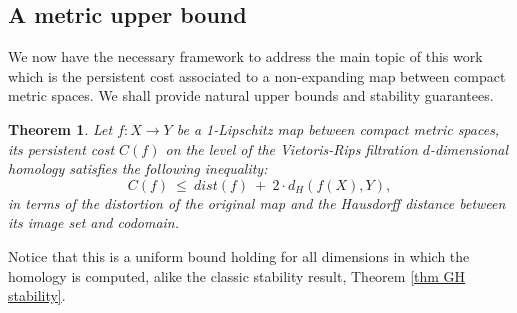 \documentclass[11pt]{article}
\newtheorem{thm}{Theorem}[section]
\begin{document}
\subsection{A metric upper bound} %

We now have the necessary framework to address the main topic of this work which is the persistent cost associated to a non-expanding map between compact metric spaces. 
We shall provide natural upper bounds and stability guarantees. 


\begin{thm}\label{thm main 1 - metric bound} Let $f:X\to Y$ be a 1-Lipschitz map between compact metric spaces, its persistent cost $C(f)$ on the level of the Vietoris-Rips filtration $d$-dimensional homology satisfies the following inequality:
\[ C(f)~\leq~ dist(f)~+~2\cdot d_H(f(X), Y)    , \] 
in terms of the distortion of the original map and the Hausdorff distance between its image set and codomain.
\end{thm}
Notice that this is a uniform bound holding for all dimensions in which the homology is computed, alike the classic stability result, Theorem \ref{thm GH stability}.
\end{document}
